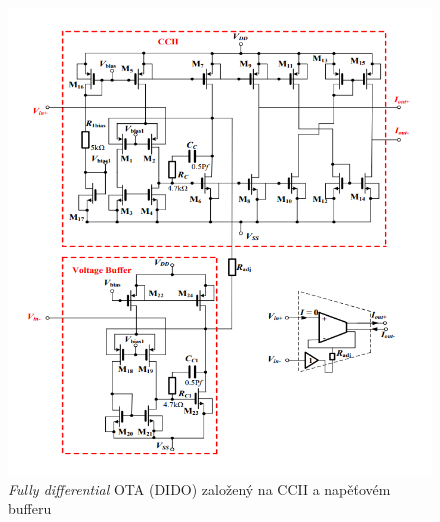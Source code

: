 \begin{figure}[h]
\centering
\includegraphics[scale=0.6]{dido.png}
\caption[\textit{Fully differential} OTA (DIDO) založený na CCII a napěťovém bufferu]{\textit{Fully differential} OTA (DIDO) založený na CCII a napěťovém bufferu \cite{8}}
\end{figure}
\newpage

